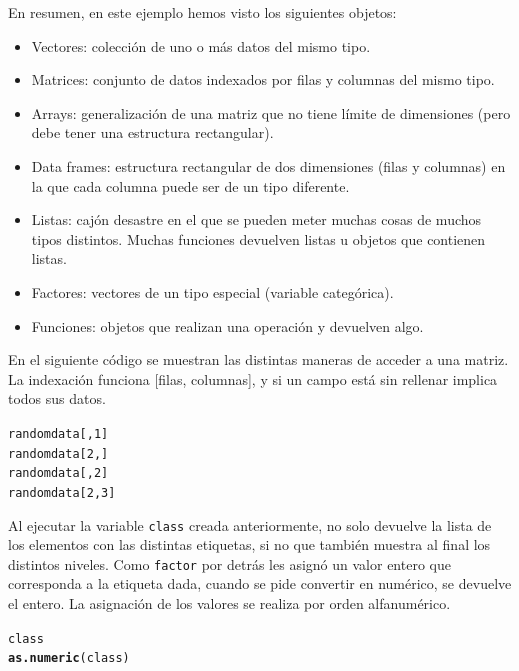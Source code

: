 \documentclass{config/apuntes}\usepackage[]{graphicx}\usepackage[]{xcolor}
\makeatletter
\newcommand{\hlnum}[1]{\textcolor[rgb]{0.686,0.059,0.569}{#1}}%
\newcommand{\hldef}[1]{\textcolor[rgb]{0.345,0.345,0.345}{#1}}%
\newcommand{\hlkwd}[1]{\textcolor[rgb]{0.737,0.353,0.396}{\textbf{#1}}}%
\newenvironment{kframe}{%
 \def\at@end@of@kframe{}%
 \ifinner\ifhmode%
  \def\at@end@of@kframe{\end{minipage}}%
  \begin{minipage}{\columnwidth}%
 \fi\fi%
 \def\FrameCommand##1{\hskip\@totalleftmargin \hskip-\fboxsep
 \colorbox{shadecolor}{##1}\hskip-\fboxsep
     \hskip-\linewidth \hskip-\@totalleftmargin \hskip\columnwidth}%
 \MakeFramed {\advance\hsize-\width
   \@totalleftmargin\z@ \linewidth\hsize
   \@setminipage}}%
 {\par\unskip\endMakeFramed%
 \at@end@of@kframe}
\newenvironment{knitrout}{}{} %
\newcommand{\code}[1]{\texttt{#1}}
\makeatother
\begin{document}
En resumen, en este ejemplo hemos visto los siguientes objetos:
\begin{itemize}
\item Vectores: colección de uno o más datos del mismo tipo.
\item Matrices: conjunto de datos indexados por filas y columnas del mismo tipo. 
\item Arrays: generalización de una matriz que no tiene límite de dimensiones (pero debe tener una estructura rectangular). 
\item Data frames: estructura rectangular de dos dimensiones (filas y columnas) en la que cada columna puede ser de un tipo diferente. 
\item Listas: cajón desastre en el que se pueden meter muchas cosas de muchos tipos distintos. Muchas funciones devuelven listas u objetos que contienen listas.
\item Factores: vectores de un tipo especial (variable categórica).
\item Funciones: objetos que realizan una operación y devuelven algo. 
\end{itemize}

En el siguiente código se muestran las distintas maneras de acceder a una matriz. La indexación funciona [filas, columnas], y si un campo está sin rellenar implica todos sus datos.

\begin{knitrout}
\color{fgcolor}\begin{kframe}
\begin{alltt}
\hldef{randomdata[,} \hlnum{1}\hldef{]}
\hldef{randomdata[}\hlnum{2}\hldef{, ]}
\hldef{randomdata[,} \hlnum{2}\hldef{]}
\hldef{randomdata[}\hlnum{2}\hldef{,} \hlnum{3}\hldef{]}
\end{alltt}
\end{kframe}
\end{knitrout}

Al ejecutar la variable \code{class} creada anteriormente, no solo devuelve la lista de los elementos con las distintas etiquetas, si no que también muestra al final los distintos niveles. Como \code{factor} por detrás les asignó un valor entero que corresponda a la etiqueta dada, cuando se pide convertir en numérico, se devuelve el entero. La asignación de los valores se realiza por orden alfanumérico.

\begin{knitrout}
\color{fgcolor}\begin{kframe}
\begin{alltt}
\hldef{class}
\hlkwd{as.numeric}\hldef{(class)}
\end{alltt}
\end{kframe}
\end{knitrout}
\end{document}
